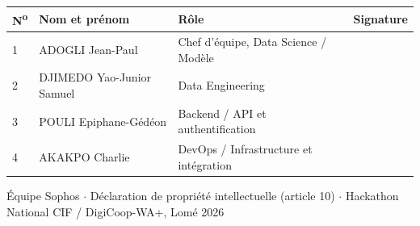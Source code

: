 \documentclass[11pt,a4paper]{article}
\begin{document}
\smallskip
\begin{center}
\footnotesize
\renewcommand{\arraystretch}{1.7}
\begin{tabular}{@{}p{0.6cm} p{4.7cm} p{4.6cm} p{4.0cm}@{}}
\toprule
\textbf{N\textsuperscript{o}} & \textbf{Nom et prénom} & \textbf{Rôle} & \textbf{Signature} \\
\midrule
1 & ADOGLI Jean-Paul & Chef d'équipe, Data Science / Modèle & \\
2 & DJIMEDO Yao-Junior Samuel & Data Engineering & \\
3 & POULI Epiphane-Gédéon & Backend / API et authentification & \\
4 & AKAKPO Charlie & DevOps / Infrastructure et intégration & \\
\bottomrule
\end{tabular}
\end{center}

\begin{center}
{\footnotesize\color{softgray}Équipe Sophos $\cdot$ Déclaration de propriété intellectuelle
(article 10) $\cdot$ Hackathon National CIF / DigiCoop-WA+, Lomé 2026}
\end{center}
\end{document}
